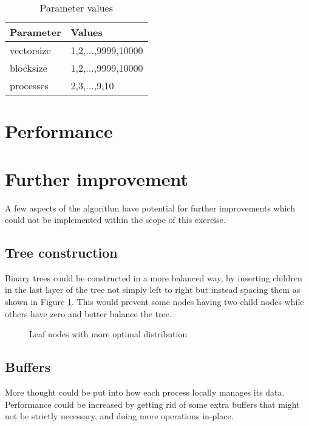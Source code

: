 \documentclass[twoside,twocolumn,hidelinks]{article}
\begin{document}
\begin{table}[h]
      \centering
      \begin{tabular}{ll}
            \toprule
            Parameter & Values \\
            \midrule
            vectorsize   & 1,2,...,9999,10000 \\
            blocksize    & 1,2,...,9999,10000  \\
            processes    & 2,3,...,9,10  \\
            \bottomrule
      \end{tabular}
      \caption{Parameter values}
\end{table}

\section{Performance}

\section{Further improvement}
A few aspects of the algorithm have potential for further improvements which could not be implemented within the scope of this exercise.
\subsection{Tree construction}
Binary trees could be constructed in a more balanced way, by inserting children in the last layer of the tree not simply left to right but instead spacing them as shown in Figure \ref{fig:leaf_node_spacing}. This would prevent some nodes having two child nodes while others have zero and better balance the tree.

\begin{figure}
      \centering
      \caption{Leaf nodes with more optimal distribution}
      \label{fig:leaf_node_spacing}
\end{figure}

\subsection{Buffers}
More thought could be put into how each process locally manages its data. Performance could be increased by getting rid of some extra buffers that might not be strictly necessary, and doing more operations in-place.
\end{document}
